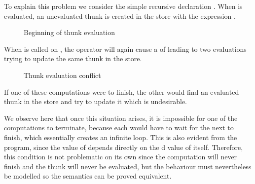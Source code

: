 To explain this problem we consider the simple recursive declaration
. When  is evaluated, an unevaluated thunk is created in
the store with the expression .
\begin{figure}[h]
\centering
{}
  \caption{Beginning of thunk evaluation}
\end{figure}
When  is called on , the \lit{+} operator will again cause a
 of  leading to two evaluations trying to update the same
thunk in the store.
\begin{figure}[h]
\centering
{}
  \caption{Thunk evaluation conflict}
\end{figure}
If one of these computations were to finish, the other would find an evaluated
thunk in the store and try to update it which is undesirable.

We observe here that once this situation arises, it is impossible for one of the
computations to terminate, because each  would have to wait for the
next  to finish, which essentially creates an infinite loop. This is
also evident from the program, since the value of  depends directly on
the d value of itself. Therefore, this condition is not problematic
on its own since the computation will never finish and the thunk will never be
evaluated, but the behaviour must nevertheless be modelled so the semantics can
be proved equivalent.

